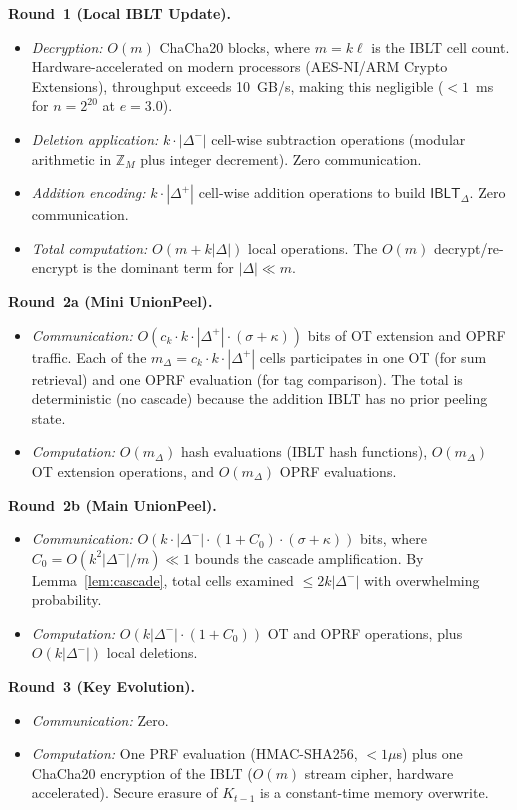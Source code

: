 \documentclass[letterpaper,twocolumn,10pt]{article}
\theoremstyle{definition}
\newcommand{\Z}{\mathbb{Z}}\newcommand{\N}{\mathbb{N}}
\begin{document}
\smallskip\noindent\textbf{Round~1 (Local IBLT Update).}
\begin{itemize}
\item \emph{Decryption:} $O(m)$ ChaCha20 blocks, where $m = k\ell$ is the
IBLT cell count. Hardware-accelerated on modern processors (AES-NI/ARM
Crypto Extensions), throughput exceeds 10~GB/s, making this negligible
($<1$~ms for $n = 2^{20}$ at $e = 3.0$).
\item \emph{Deletion application:} $k \cdot |\Delta^-|$ cell-wise subtraction
operations (modular arithmetic in $\Z_M$ plus integer decrement). Zero
communication.
\item \emph{Addition encoding:} $k \cdot |\Delta^+|$ cell-wise addition
operations to build $\mathsf{IBLT}_{\Delta}$. Zero communication.
\item \emph{Total computation:} $O(m + k|\Delta|)$ local operations. The
$O(m)$ decrypt/re-encrypt is the dominant term for $|\Delta| \ll m$.
\end{itemize}

\smallskip\noindent\textbf{Round~2a (Mini UnionPeel).}
\begin{itemize}
\item \emph{Communication:} $O(c_k \cdot k \cdot |\Delta^+| \cdot (\sigma +
\kappa))$ bits of OT extension and OPRF traffic. Each of the
$m_{\Delta} = c_k \cdot k \cdot |\Delta^+|$ cells participates in one OT
(for sum retrieval) and one OPRF evaluation (for tag comparison). The total
is deterministic (no cascade) because the addition IBLT has no prior peeling
state.
\item \emph{Computation:} $O(m_{\Delta})$ hash evaluations (IBLT hash
functions), $O(m_{\Delta})$ OT extension operations, and $O(m_{\Delta})$
OPRF evaluations.
\end{itemize}

\smallskip\noindent\textbf{Round~2b (Main UnionPeel).}
\begin{itemize}
\item \emph{Communication:} $O(k \cdot |\Delta^-| \cdot (1 + C_0) \cdot
(\sigma + \kappa))$ bits, where $C_0 = O(k^2|\Delta^-|/m) \ll 1$ bounds
the cascade amplification. By Lemma~\ref{lem:cascade}, total cells examined
$\leq 2k|\Delta^-|$ with overwhelming probability.
\item \emph{Computation:} $O(k|\Delta^-| \cdot (1 + C_0))$ OT and OPRF
operations, plus $O(k|\Delta^-|)$ local deletions.
\end{itemize}

\smallskip\noindent\textbf{Round~3 (Key Evolution).}
\begin{itemize}
\item \emph{Communication:} Zero.
\item \emph{Computation:} One PRF evaluation (HMAC-SHA256, $<1\mu$s) plus
one ChaCha20 encryption of the IBLT ($O(m)$ stream cipher, hardware
accelerated). Secure erasure of $K_{t-1}$ is a constant-time memory
overwrite.
\end{itemize}
\end{document}

